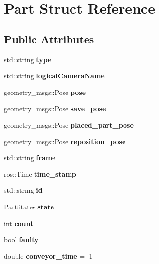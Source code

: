 \hypertarget{structPart}{}\section{Part Struct Reference}
\label{structPart}
\subsection*{Public Attributes}
\begin{DoxyCompactItemize}
\item 
\mbox{\label{structPart_a8a7254c9b4d72b1e04e0b973ed26848e}} 
std\+::string {\bfseries type}
\item 
\mbox{\label{structPart_a50a8ed9e00708d495a945397b13ec7b7}} 
std\+::string {\bfseries logical\+Camera\+Name}
\item 
\mbox{\label{structPart_a67a8ee9f1aaecf76537554dbc429bca8}} 
geometry\+\_\+msgs\+::\+Pose {\bfseries pose}
\item 
\mbox{\label{structPart_ac1f55ac553e1680d2e38d0efdf567efa}} 
geometry\+\_\+msgs\+::\+Pose {\bfseries save\+\_\+pose}
\item 
\mbox{\label{structPart_ad2c8147e827ef6dc142a6749aa7380c1}} 
geometry\+\_\+msgs\+::\+Pose {\bfseries placed\+\_\+part\+\_\+pose}
\item 
\mbox{\label{structPart_a9d6659e80e147db071667be8f6994c72}} 
geometry\+\_\+msgs\+::\+Pose {\bfseries reposition\+\_\+pose}
\item 
\mbox{\label{structPart_a8576f0aea825bbc9e38e75e01528db9b}} 
std\+::string {\bfseries frame}
\item 
\mbox{\label{structPart_a2fbe1ce4e5592f01c28d6f63a41f337b}} 
ros\+::\+Time {\bfseries time\+\_\+stamp}
\item 
\mbox{\label{structPart_ac78dd973677ae60144acd1dd72a77e70}} 
std\+::string {\bfseries id}
\item 
\mbox{\label{structPart_a3d0424b1b6ad362298da16ada9c60959}} 
Part\+States {\bfseries state}
\item 
\mbox{\label{structPart_a48a353099c269829c7ac631eed08ed3f}} 
int {\bfseries count}
\item 
\mbox{\label{structPart_aee7645853988219a61288a9d19603852}} 
bool {\bfseries faulty}
\item 
\mbox{\label{structPart_a02bc909db0ffdb25e411bfdf495cd06a}} 
double {\bfseries conveyor\+\_\+time} = -\/1
\end{DoxyCompactItemize}


